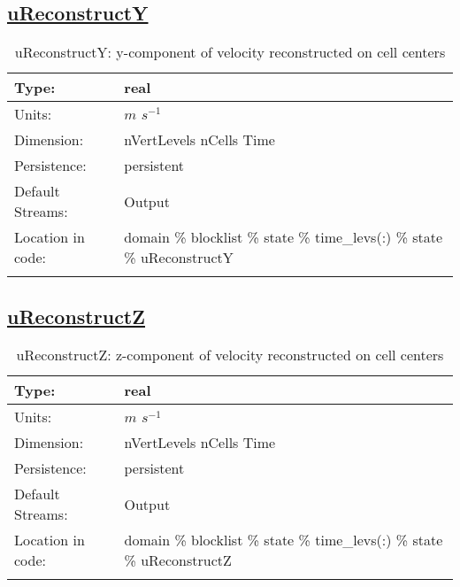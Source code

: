 \subsection[uReconstructY]{\hyperref[sec:var_tab_state]{uReconstructY}}
\label{subsec:var_sec_state_uReconstructY}
\begin{center}
\begin{longtable}{| p{2.0in} | p{4.0in} |}
        \hline 
        Type: & real \\
        \hline 
        Units: & $m$ $s^{-1}$ \\
        \hline 
        Dimension: & nVertLevels nCells Time \\
        \hline 
        Persistence: & persistent \\
        \hline 
		 Default Streams: & Output  \\
        \hline 
		 Location in code: & domain \% blocklist \% state \% time\_levs(:) \% state \% uReconstructY \\
		 \hline 
    \caption{uReconstructY: y-component of velocity reconstructed on cell centers}
\end{longtable}
\end{center}
\subsection[uReconstructZ]{\hyperref[sec:var_tab_state]{uReconstructZ}}
\label{subsec:var_sec_state_uReconstructZ}
\begin{center}
\begin{longtable}{| p{2.0in} | p{4.0in} |}
        \hline 
        Type: & real \\
        \hline 
        Units: & $m$ $s^{-1}$ \\
        \hline 
        Dimension: & nVertLevels nCells Time \\
        \hline 
        Persistence: & persistent \\
        \hline 
		 Default Streams: & Output  \\
        \hline 
		 Location in code: & domain \% blocklist \% state \% time\_levs(:) \% state \% uReconstructZ \\
		 \hline 
    \caption{uReconstructZ: z-component of velocity reconstructed on cell centers}
\end{longtable}
\end{center}
